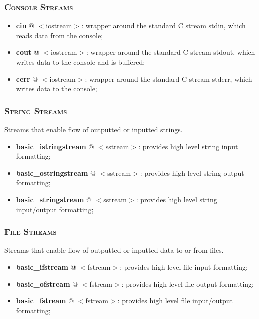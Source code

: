 \documentclass[10pt]{article}
\begin{document}
\begin{multicols*}{5}
{\subsubsection*{\textsc{Console Streams}} 
\begin{itemize}[leftmargin=*,topsep=0.25pt]
  \setlength\itemsep{-1.8pt}
	\item \textbf{cin} @ $<$iostream$>$: wrapper around the standard C stream stdin, which reads data from the console;
	\item \textbf{cout} @ $<$iostream$>$: wrapper around the standard C stream stdout, which writes data to the console and is buffered;
	\item \textbf{cerr} @ $<$iostream$>$: wrapper around the standard C stream stderr, which writes data to the console;
\end{itemize}

\subsubsection*{\textsc{String Streams}}
\noindent
Streams that enable flow of outputted or inputted strings.

\begin{itemize}[leftmargin=*,topsep=0.25pt]
  \setlength\itemsep{-1.8pt}
	\item \textbf{basic\_istringstream} @ $<$sstream$>$: provides high level string input formatting;
	\item \textbf{basic\_ostringstream} @ $<$sstream$>$: provides high level string output formatting;
	\item \textbf{basic\_stringstream} @ $<$sstream$>$: provides high level string input/output formatting;
\end{itemize}


\subsubsection*{\textsc{File Streams}} 
\noindent
Streams that enable flow of outputted or inputted data to or from files.

\begin{itemize}[leftmargin=*,topsep=0.25pt]
  \setlength\itemsep{-1.8pt}
	\item \textbf{basic\_ifstream} @ $<$fstream$>$: provides high level file input formatting;
	\item \textbf{basic\_ofstream} @ $<$fstream$>$: provides high level file output formatting;
	\item \textbf{basic\_fstream} @ $<$fstream$>$: provides high level file input/output formatting;
\end{itemize}

}
\end{multicols*}
\end{document}
